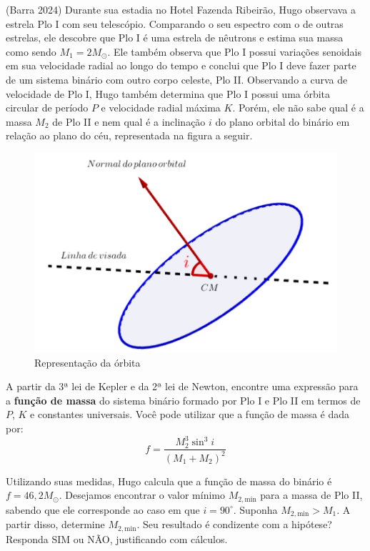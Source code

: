 \documentclass[11pt]{article}
\begin{document}
\begin{pproblem}(Barra 2024) Durante sua estadia no Hotel Fazenda Ribeirão, Hugo observava a estrela Plo I com seu telescópio. Comparando o seu espectro com o de outras estrelas, ele descobre que Plo I é uma estrela de nêutrons e estima sua massa como sendo \( M_1 = 2M_{\odot} \). Ele também observa que Plo I possui variações senoidais em sua velocidade radial ao longo do tempo e conclui que Plo I deve fazer parte de um sistema binário com outro corpo celeste, Plo II. Observando a curva de velocidade de Plo I, Hugo também determina que Plo I possui uma órbita circular de período \( P \) e velocidade radial máxima \( K \). Porém, ele não sabe qual é a massa \( M_2 \) de Plo II e nem qual é a inclinação \( i \) do plano orbital do binário em relação ao plano do céu, representada na figura a seguir.

    \begin{figure}[H]
        \centering
        \includegraphics[width=0.8\linewidth]{imagens/figurabarra.png}
        \caption{Representação da órbita}
    \end{figure}

    \begin{alternativas}
        \item A partir da 3ª lei de Kepler e da 2ª lei de Newton, encontre uma expressão para a \textbf{função de massa} do sistema binário formado por Plo I e Plo II em termos de \( P \), \( K \) e constantes universais. Você pode utilizar que a função de massa é dada por:
        \[
            f = \frac{M_2^3 \sin^3 i}{(M_1 + M_2)^2}
        \]
    
        \item Utilizando suas medidas, Hugo calcula que a função de massa do binário é \( f = 46,2M_{\odot} \). Desejamos encontrar o valor mínimo \( M_{2,\text{min}} \) para a massa de Plo II, sabendo que ele corresponde ao caso em que \( i = 90^\circ \). Suponha \( M_{2,\text{min}} > M_1 \). A partir disso, determine \( M_{2,\text{min}} \). Seu resultado é condizente com a hipótese? Responda SIM ou NÃO, justificando com cálculos.
        

\end{alternativas}
\end{pproblem}
\end{document}

